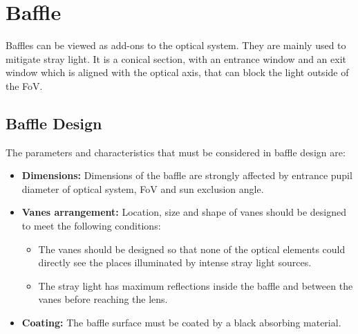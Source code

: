 \section{Baffle}
Baffles can be viewed as add-ons to the optical system. They are mainly used to mitigate stray light. It is a conical section, with an entrance window and an exit window which is aligned with the optical axis, that can block the light outside of the FoV.

\subsection{Baffle Design}
The parameters and characteristics that must be considered in baffle design are:
\begin{itemize}
    \item \textbf{Dimensions:} Dimensions of the baffle are strongly affected by entrance pupil diameter of optical system, FoV and sun exclusion angle.
    \item \textbf{Vanes arrangement:} Location, size and shape of vanes should be designed to meet the following conditions:
    \begin{itemize}
        \item The vanes should be designed so that none of the optical elements could directly see the places illuminated by intense stray light sources.
        \item The stray light has maximum reflections inside the baffle and between the vanes before reaching the lens.
    \end{itemize}
    \item \textbf{Coating:} The baffle surface must be coated by a black absorbing material.
\end{itemize}

